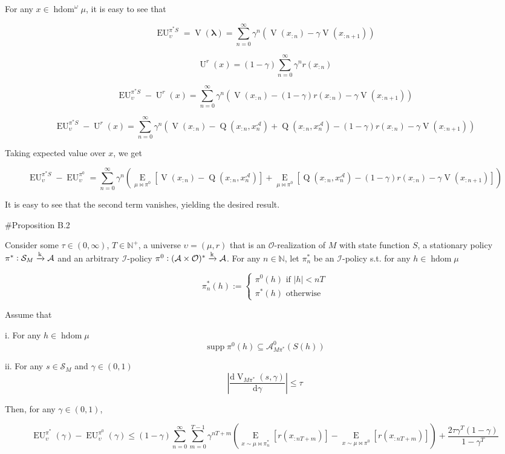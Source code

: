 \documentclass[a4paper]{article}
\DeclareMathOperator{\Supp}{supp}
\newcommand{\AP}[1]{\left(#1\right)}
\newcommand{\AB}[1]{\left[#1\right]}
\newcommand{\E}[1]{\underset{#1}{\operatorname{E}}}
\newcommand{\Ea}[2]{\underset{#1}{\operatorname{E}}\AB{#2}}
\newcommand{\D}{\mathrm{d}}
\newcommand{\Nats}{\mathbb{N}}
\newcommand{\Estr}{\boldsymbol{\lambda}}
\newcommand{\Abs}[1]{\left\vert #1 \right\vert}
\newcommand{\M}{\xrightarrow{\textnormal{k}}}
\newcommand{\Ob}{\mathcal{O}}
\newcommand{\A}{\mathcal{A}}
\newcommand{\St}{\mathcal{S}}
\newcommand{\In}{\mathcal{I}}
\newcommand{\FH}{(\A \times \Ob)^*}
\DeclareMathOperator{\HD}{hdom}
\newcommand{\Ut}{\operatorname{U}}
\newcommand{\V}{\operatorname{V}}
\newcommand{\Q}{\operatorname{Q}}
\newcommand{\EU}{\operatorname{EU}}
\begin{document}
For any $x \in \HD^\omega \mu$, it is easy to see that

$$\EU_{\upsilon}^{\pi^* S}=\V\AP{\Estr}=\sum_{n=0}^\infty \gamma^n \AP{\V\AP{x_{:n}}-\gamma\V\AP{x_{:n+1}}}$$

$$\Ut^{r}(x)=(1-\gamma)\sum_{n=0}^\infty \gamma^n r\AP{x_{:n}}$$

$$\EU_{\upsilon}^{\pi^* S} - \Ut^{r}(x)=\sum_{n=0}^\infty \gamma^n \AP{\V\AP{x_{:n}}-(1-\gamma)r\AP{x_{:n}}-\gamma\V\AP{x_{:n+1}}}$$

$$\EU_{\upsilon}^{\pi^* S} - \Ut^{r}(x)=\sum_{n=0}^\infty \gamma^n \AP{\V\AP{x_{:n}}-\Q\AP{x_{:n},x_n^\A}+\Q\AP{x_{:n},x_n^\A}-(1-\gamma)r\AP{x_{:n}}-\gamma\V\AP{x_{:n+1}}}$$

Taking expected value over $x$, we get

$$\EU_{\upsilon}^{\pi^* S} - \EU_{\upsilon}^{\pi^0}=\sum_{n=0}^\infty \gamma^n \AP{\Ea{\mu\bowtie\pi^0}{\V\AP{x_{:n}}-\Q\AP{x_{:n},x_n^\A}}+\Ea{\mu\bowtie\pi^0}{\Q\AP{x_{:n},x_n^\A}-(1-\gamma)r\AP{x_{:n}}-\gamma\V\AP{x_{:n+1}}}}$$

It is easy to see that the second term vanishes, yielding the desired result.

\#Proposition B.2

Consider some $\tau\in(0,\infty)$, $T\in\Nats^+$, a universe $\upsilon=(\mu,r)$ that is an $\Ob$-realization of $M$ with state function $S$, a stationary policy $\pi^*: \St_M \M \A$ and an arbitrary $\In$-policy $\pi^0: \FH \M \A$. For any $n \in \Nats$, let $\pi^*_n$ be an $\In$-policy s.t. for any $h \in \HD{\mu}$

$$\pi^*_n(h):=\begin{cases} \pi^0(h) \text{ if } \Abs{h} < nT \\ \pi^*(h) \text{ otherwise} \end{cases}$$

Assume that

i. For any $h \in \HD{\mu}$ $$\Supp{\pi^0(h)} \subseteq \A_{M\pi^*}^0\AP{S(h)}$$

ii. For any $s \in \St_M$ and $\gamma\in(0,1)$ $$\Abs{\frac{\D\V_{M\pi^*}\AP{s,\gamma}}{\D\gamma}} \leq \tau$$

Then, for any $\gamma\in(0,1)$,

$$\EU^{\pi^*}_\upsilon(\gamma)-\EU^{\pi^0}_\upsilon(\gamma) \leq (1-\gamma)\sum_{n=0}^\infty \sum_{m=0}^{T-1} \gamma^{nT+m}\left(\E{x\sim\mu\bowtie\pi^*_n}\left[r\left(x_{:nT+m}\right)\right]-\E{x\sim\mu\bowtie\pi^0}\left[r\left(x_{:nT+m}\right)\right]\right) + \frac{2\tau\gamma^T(1-\gamma)}{1-\gamma^T}$$
\end{document}
